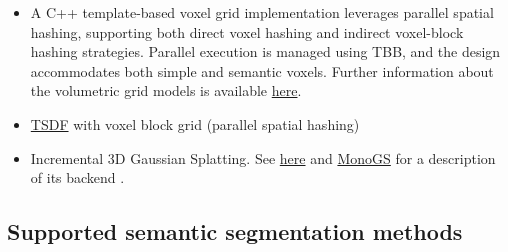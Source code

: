 \documentclass{article}
\providecommand{\tightlist}{%
  \setlength{\itemsep}{0pt}\setlength{\parskip}{0pt}}
\begin{document}
\begin{itemize}
\tightlist
\item
  A C++ template-based voxel grid implementation leverages parallel
  spatial hashing, supporting both direct voxel hashing and indirect
  voxel-block hashing strategies. Parallel execution is managed using
  TBB, and the design accommodates both simple and semantic voxels.
  Further information about the volumetric grid models is available
  \href{https://github.com/luigifreda/pyslam/blob/master/cpp/modules/volumetric/README.md}{here}.
\item    
  \href{https://arxiv.org/pdf/2110.00511}{TSDF} with voxel block grid
  (parallel spatial hashing)~\cite{dong2022ash}
\item
  Incremental 3D Gaussian Splatting. See
  \href{https://repo-sam.inria.fr/fungraph/3d-gaussian-splatting/}{here}
  and \href{https://arxiv.org/abs/2312.06741}{MonoGS} for a description
  of its backend \cite{matsuki2023gaussian, kerbl20233d}.
\end{itemize}

\hypertarget{supported-semantic-segmentation-methods}{%
\subsection{Supported semantic segmentation
methods}\label{supported-semantic-segmentation-methods}}
\end{document}
